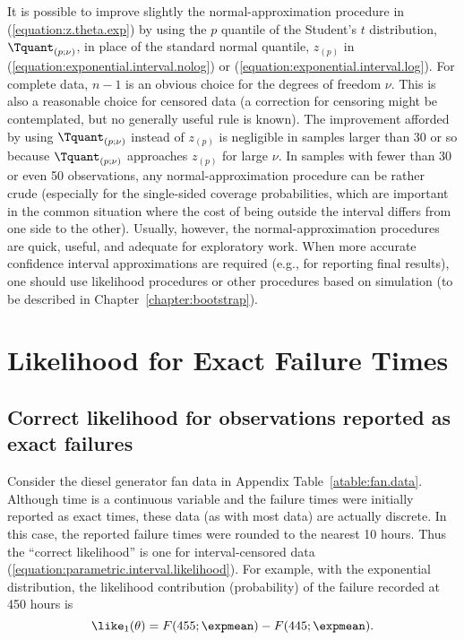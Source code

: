 It is possible to improve slightly the normal-approximation
procedure in (\ref{equation:z.theta.exp}) by using the $p$ quantile
of the Student's $t$ distribution, $\Tquant_{(p;\nu)}$, in place of
the standard normal quantile, $z_{(p)}$ in
(\ref{equation:exponential.interval.nolog}) or
(\ref{equation:exponential.interval.log}). For complete data, $n-1$
is an obvious choice for the degrees of freedom $\nu$. This is also
a reasonable choice for censored data (a correction for censoring
might be contemplated, but no generally useful rule is known). The
improvement afforded by using $\Tquant_{(p;\nu)}$ instead of
$z_{(p)}$ is negligible in samples larger than 30 or so because
$\Tquant_{(p;\nu)}$ approaches $z_{(p)}$ for large $\nu$. In samples
with fewer than 30 or even 50 observations, any normal-approximation
procedure can be rather crude (especially for the single-sided
coverage probabilities, which are important in the common situation
where the cost of being outside the interval differs from one
side to the other).  Usually, however, the normal-approximation
procedures are quick, useful, and adequate for exploratory
work. When more accurate confidence interval approximations are
required (e.g., for reporting final results), one should use
likelihood procedures or other procedures based on simulation (to be
described in Chapter~\ref{chapter:bootstrap}).


\section{Likelihood for Exact Failure Times}
\label{section:exact.fail.like}
\subsection{Correct likelihood for observations 
reported as exact failures}

Consider the diesel generator fan data in Appendix
Table~\ref{atable:fan.data}.  Although time is a continuous variable
and the failure times were
initially reported as exact times, these data (as with most data)
are actually discrete.  In this case, the reported
failure times were rounded to the nearest 10 hours.  Thus the
``correct likelihood'' is one for interval-censored data
(\ref{equation:parametric.interval.likelihood}).  For example, with
the exponential distribution, the likelihood contribution
(probability) of the failure recorded at 450 hours is
\begin{displaymath}
\like_{1}(\theta)=F(455;\expmean)-F(445;\expmean).
\end{displaymath}


